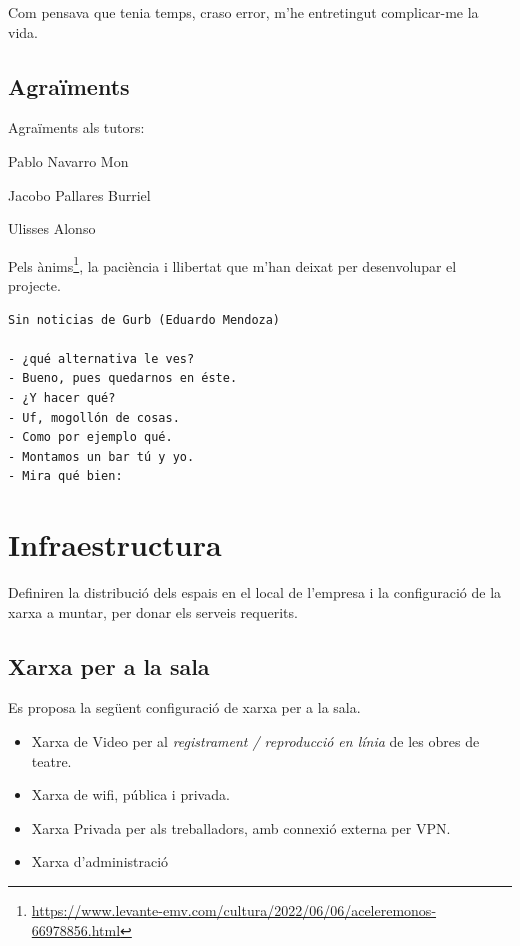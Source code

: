 \documentclass[
  10pt,
]{krantz}
\DeclareRobustCommand{\href}[2]{#2\footnote{\url{#1}}}
\providecommand{\tightlist}{%
  \setlength{\itemsep}{0pt}\setlength{\parskip}{0pt}}
\begin{document}
Com pensava que tenia temps, craso error, m'he entretingut complicar-me la vida.

\hypertarget{agrauxefments}{%
\section*{Agraïments}\label{agrauxefments}}


Agraïments als tutors:

Pablo Navarro Mon

Jacobo Pallares Burriel

Ulisses Alonso

Pels \href{https://www.levante-emv.com/cultura/2022/06/06/aceleremonos-66978856.html}{ànims}, la paciència i llibertat que m'han deixat per desenvolupar el projecte.

\begin{verbatim}
Sin noticias de Gurb (Eduardo Mendoza)

- ¿qué alternativa le ves?
- Bueno, pues quedarnos en éste.
- ¿Y hacer qué?
- Uf, mogollón de cosas.
- Como por ejemplo qué.
- Montamos un bar tú y yo.
- Mira qué bien:
\end{verbatim}

\hypertarget{infraestructura}{%
\chapter{Infraestructura}\label{infraestructura}}

Definiren la distribució dels espais en el local de l'empresa i la configuració de la xarxa a muntar, per donar els serveis requerits.

\hypertarget{xarxa-per-a-la-sala}{%
\section{Xarxa per a la sala}\label{xarxa-per-a-la-sala}}

Es proposa la següent configuració de xarxa per a la sala.

\begin{itemize}
\tightlist
\item
  Xarxa de Video per al \emph{registrament / reproducció en línia} de les obres de teatre.
\item
  Xarxa de wifi, pública i privada.
\item
  Xarxa Privada per als treballadors, amb connexió externa per VPN.
\item
  Xarxa d'administració
\end{itemize}
\end{document}
